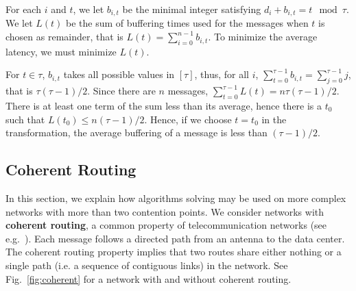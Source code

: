 \documentclass[pdflatex,sn-mathphys,iicol]{sn-jnl}%
\theoremstyle{thmstyleone}%
\theoremstyle{thmstyletwo}%
\theoremstyle{thmstylethree}%
\begin{document}
 For each $i$ and $t$, we let $b_{i,t}$ be the minimal integer satisfying $d_i + b_{i,t} = t \mod \tau$. We let $L(t)$ be the sum of buffering times used for the messages when $t$ is chosen as remainder, that is $L(t) = \sum_{i=0}^{n-1} b_{i,t}$. To minimize the average latency, we must minimize $L(t)$.

 For $t \in \tau$, $b_{i,t}$ takes all possible values in $[\tau]$,
 thus, for all $i$, $\sum_{t=0}^{\tau-1} b_{i,t} = \sum_{j=0}^{\tau-1} j$, that is $\tau (\tau-1)/2$. Since there are $n$ messages, $\sum_{t=0}^{\tau -1} L(t) = n \tau (\tau-1)/2$. There is at least one term of the sum less than its average, hence there is a $t_0$ such that $L(t_0) \leq n (\tau-1)/2$. Hence, if we choose $t= t_0$ in the transformation, the average buffering of a message is less than $(\tau -1)/2$.

\subsection{Coherent Routing}\label{sec:coherent}

In this section, we explain how algorithms solving \pma may be used on more complex networks with more than two contention points.
We consider networks with \textbf{coherent routing}, a common property of telecommunication networks (see e.g.~\cite{Schwiebert1996ANA}).
Each message follows a directed path from an antenna to the data center.
The coherent routing property implies that two routes share either nothing or a single path (i.e. a sequence of contiguous links) in the network. See Fig.~\ref{fig:coherent} for a network with and without coherent routing.
\end{document}
